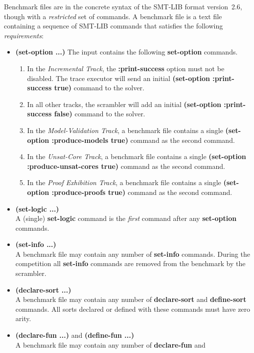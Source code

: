 \documentclass[12pt]{article}
\newcommand{\akey}[1]{\textbf{#1}\xspace}
\newcommand{\bkey}[1]{\textbf{{#1}}\xspace}
\newcommand{\inctrack}{Incremental Track\xspace}
\newcommand{\ucoretrack}{Unsat-Core Track\xspace}
\newcommand{\mvaltrack}{Model-Validation Track\xspace}
\newcommand{\prooftrack}{Proof Exhibition Track\xspace}
\begin{document}
Benchmark files are in the concrete syntax of the SMT-LIB format
version~2.6, though with a \emph{restricted} set of commands.  A benchmark
file is a text file containing a sequence of SMT-LIB commands that
satisfies the following \emph{requirements}:
%
\begin{itemize}
  \item
    \bkey{(set-option ...)}
    The input contains the following \akey{set-option} commands.
    \begin{enumerate}[label=(\alph*)]
    \item In the \emph{\inctrack}, the \akey{:print-success} option
      must not be disabled.  The trace executor will send an initial
      \akey{(set-option :print-success true)} command to the solver.
    \item In all other tracks, the scrambler will add an initial
      \akey{(set-option :print-success false)} command to the solver.
    \item In the \emph{\mvaltrack}, a benchmark file contains a single
      \akey{(set-option :produce-models true)} command as the second command.
    \item In the \emph{\ucoretrack}, a benchmark file contains a
      single \akey{(set-option :produce-unsat-cores true)} command as
      the second command.
    \item In the \emph{\prooftrack}, a benchmark file contains a
      single \akey{(set-option :produce-proofs true)} command as
      the second command.
    \end{enumerate}
  \item \bkey{(set-logic ...)}\\
    A (single) \akey{set-logic} command is the \emph{first} command after
    any \akey{set-option} commands.
  \item \bkey{(set-info ...)}\\
    A benchmark file may contain any number of \akey{set-info} commands.
    During the competition all \akey{set-info} commands are removed from
    the benchmark by the scrambler.
  \item \bkey{(declare-sort ...)}\\
    A benchmark file may contain any number of \akey{declare-sort} and
    \akey{define-sort} commands.  All sorts declared or defined with these
    commands must have zero arity.
  \item \bkey{(declare-fun ...)} and \bkey{(define-fun ...)}\\
    A benchmark file may contain any number of \akey{declare-fun} and

\end{itemize}
\end{document}
